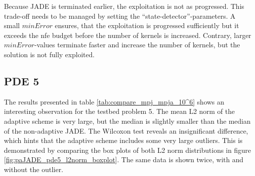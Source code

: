 \documentclass[./\jobname.tex]{subfiles}
\begin{document}
\begin{figure}[H]
	\centering
	\noindent{}
	\label{fig:subexperiment_pde2347_kernels_l2norm}
\end{figure}

Because JADE is terminated earlier, the exploitation is not as progressed. This trade-off needs to be managed by setting the ``state-detector''-parameters. A small $minError$ ensures, that the exploitation is progressed sufficiently but it exceeds the \gls{nfe} budget before the number of kernels is increased. Contrary, larger $minError$-values terminate faster and increase the number of kernels, but the solution is not fully exploited. 

\subsection{PDE 5}

The results presented in table \ref{tab:compare_mpj_mpja_10^6} shows an interesting observation for the testbed problem 5. The mean L2 norm of the adaptive scheme is very large, but the median is slightly smaller than the median of the non-adaptive JADE. The Wilcoxon test reveals an insignificant difference, which hints that the adaptive scheme includes some very large outliers. This is demonstrated by comparing the box plots of both L2 norm distributions in figure \ref{fig:paJADE_pde5_l2norm_boxplot}. The same data is shown twice, with and without the outlier. 
\end{document}

